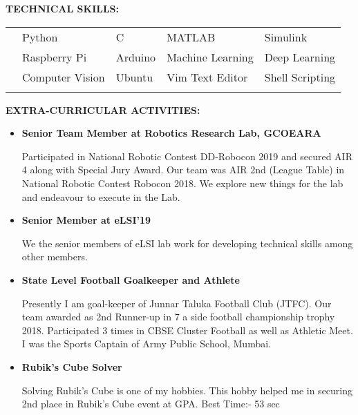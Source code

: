 \documentclass[a4paper, 10pt]{article}
\begin{document}
{\textbf{\Large{TECHNICAL SKILLS:}}}
\\
\begin{tabular}{p{1cm}p{3.5cm}p{3.5cm}p{3.5cm}p{3.5cm}}
\\
& Python & C & MATLAB & Simulink\\
& Raspberry Pi & Arduino & Machine Learning & Deep Learning\\
& Computer Vision & Ubuntu & Vim Text Editor & Shell Scripting\\
\\
\end{tabular}
\newpage
{\textbf{\Large{EXTRA-CURRICULAR ACTIVITIES:}}}
\begin{itemize}
\item \textbf{Senior Team Member at Robotics Research Lab, GCOEARA}

Participated in National Robotic Contest DD-Robocon 2019 and secured AIR 4 along with Special Jury Award$.$ Our team was AIR 2nd (League Table) in National Robotic Contest Robocon 2018$.$ We explore new things for the lab and endeavour to execute in the Lab.

\item \textbf{Senior Member at eLSI'19}

We the senior members of eLSI lab work for developing technical skills among other members.
\item \textbf{State Level Football Goalkeeper and Athlete}

Presently I am goal-keeper of Junnar Taluka Football Club (JTFC)$.$ Our team awarded as 2nd Runner-up in 7 a side football championship trophy 2018$.$ Participated 3 times in CBSE Cluster Football as well as Athletic Meet$.$ I was the Sports Captain of Army Public School, Mumbai. 

\item \textbf{Rubik's Cube Solver}

Solving Rubik's Cube is one of my hobbies$.$ This hobby helped me in securing 2nd place in Rubik's Cube event at GPA. Best Time:- 53 sec\\

\end{itemize}
\end{document}
